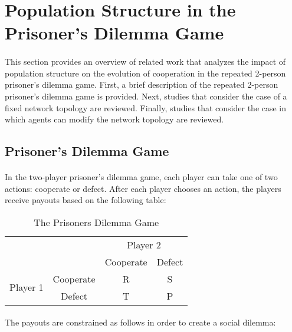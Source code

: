 \documentclass{article}
\begin{document}
    \section{Population Structure in the Prisoner’s Dilemma Game}
    \paragraph{}This section provides an overview of related work that analyzes the impact of population structure on the evolution of cooperation in the repeated 2-person prisoner’s dilemma game.  First, a brief description of the repeated 2-person prisoner’s dilemma game is provided.  Next, studies that consider the case of a fixed network topology are reviewed.  Finally, studies that consider the case in which agents can modify the network topology are reviewed.
    
    \subsection{Prisoner’s Dilemma Game}
    \paragraph{}In the two-player prisoner’s dilemma game, each player can take one of two actions: cooperate or defect.  After each player chooses an action, the players receive payouts based on the following table:
    
    \begin{table}[h!]
      \begin{center}
      \begin{tabular}{cccc}
    	\toprule
    		&	&	\multicolumn{2}{c}{Player 2} \\
    		&   & 	Cooperate & Defect  \\ \midrule
    	\multirow{2}{*}{Player 1}
    		& Cooperate   & R  & S  \\
    		& Defect  	  & T  & P \\ \bottomrule
      \end{tabular}
      \caption{The Prisoners Dilemma Game}
	  \end{center}
    \end{table}

    \paragraph{}The payouts are constrained as follows in order to create a social dilemma:
    
\end{document}
